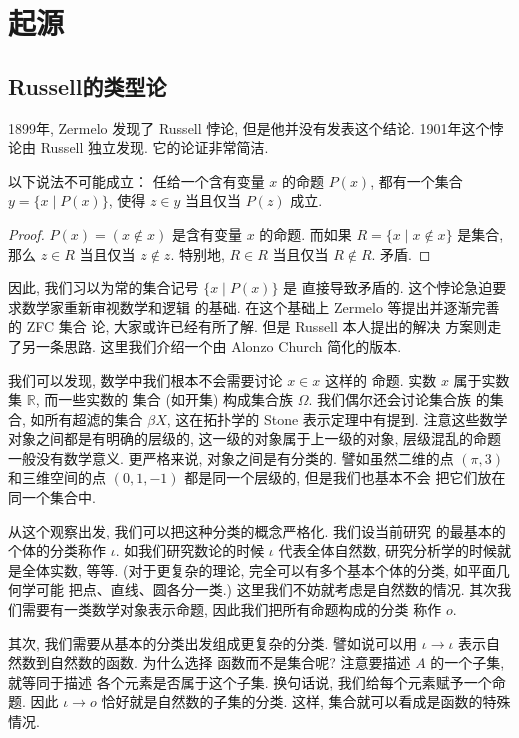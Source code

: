 \chapter{起源}
\section{Russell的类型论} %
1899年, Zermelo 发现了 Russell 悖论,
但是他并没有发表这个结论.
1901年这个悖论由 Russell 独立发现.
它的论证非常简洁.
\begin{theorem}[Russell]
以下说法不可能成立： 任给一个含有变量 \(x\) 的命题 \(P(x)\),
都有一个集合 \(y = \{x \mid P(x)\}\), 使得
\(z \in y\) 当且仅当 \(P(z)\) 成立.
\end{theorem}
\begin{proof}
\(P(x) = (x \notin x)\) 是含有变量 \(x\) 的命题.
而如果 \(R = \{x \mid x \notin x\}\) 是集合,
那么 \(z \in R\) 当且仅当 \(z \notin z\).
特别地, \(R \in R\) 当且仅当 \(R \notin R\).
矛盾.
\end{proof}
因此, 我们习以为常的集合记号 \(\{x \mid P(x)\}\) 是
直接导致矛盾的. 这个悖论急迫要求数学家重新审视数学和逻辑
的基础. 在这个基础上 Zermelo 等提出并逐渐完善的 ZFC 集合
论, 大家或许已经有所了解. 但是 Russell 本人提出的解决
方案则走了另一条思路. 这里我们介绍一个由 Alonzo Church 简化的版本.%
~\cite{sep:2022:typetheory}

我们可以发现, 数学中我们根本不会需要讨论 \(x \in x\) 这样的
命题. 实数 \(x\) 属于实数集 \(\mathbb R\), 而一些实数的
集合 (如开集) 构成集合族 \(\Omega\). 我们偶尔还会讨论集合族
的集合, 如所有超滤的集合 \(\beta X\), 这在拓扑学的
Stone 表示定理中有提到. 注意这些数学对象之间都是有明确的层级的,
这一级的对象属于上一级的对象, 层级混乱的命题一般没有数学意义.
更严格来说, 对象之间是有分类的. 譬如虽然二维的点 \((\pi, 3)\)
和三维空间的点 \((0,1,-1)\) 都是同一个层级的, 但是我们也基本不会
把它们放在同一个集合中.

从这个观察出发, 我们可以把这种分类的概念严格化. 我们设当前研究
的最基本的个体的分类称作 \(\iota\). 如我们研究数论的时候
\(\iota\) 代表全体自然数, 研究分析学的时候就是全体实数, 等等.
(对于更复杂的理论, 完全可以有多个基本个体的分类, 如平面几何学可能
把点、直线、圆各分一类.) 这里我们不妨就考虑是自然数的情况.
其次我们需要有一类数学对象表示命题, 因此我们把所有命题构成的分类
称作 \(o\).

其次, 我们需要从基本的分类出发组成更复杂的分类. 譬如说可以用
\(\iota \to \iota\) 表示自然数到自然数的函数. 为什么选择
函数而不是集合呢? 注意要描述 \(A\) 的一个子集, 就等同于描述
各个元素是否属于这个子集. 换句话说, 我们给每个元素赋予一个命题.
因此 \(\iota \to o\) 恰好就是自然数的子集的分类. 这样,
集合就可以看成是函数的特殊情况.

